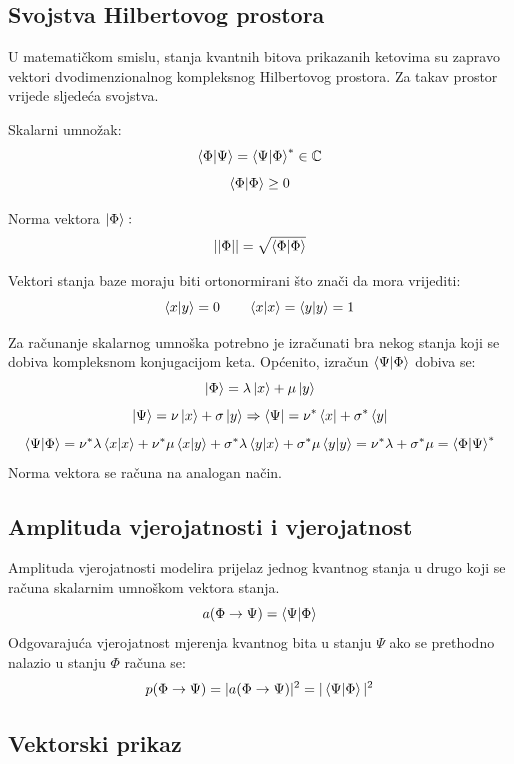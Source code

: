 \subsection{Svojstva Hilbertovog prostora}
U matematičkom smislu, stanja kvantnih bitova prikazanih ketovima su zapravo vektori dvodimenzionalnog kompleksnog Hilbertovog prostora. Za takav prostor vrijede sljedeća svojstva.

Skalarni umnožak:
\[
\braket{\Phi|\Psi} = \braket{\Psi|\Phi}^* \in \mathbb{C}
\]
\[
\braket{\Phi|\Phi} \geq 0
\]

Norma vektora $\ket{\Phi}:$
\[
||\Phi|| = \sqrt{\braket{\Phi|\Phi}}
\]

Vektori stanja baze moraju biti ortonormirani što znači da mora vrijediti:
\[
\braket{x|y} = 0
\qquad
\braket{x|x} = \braket{y|y} = 1
\]

Za računanje skalarnog umnoška potrebno je izračunati bra nekog stanja koji se dobiva kompleksnom konjugacijom keta. Općenito, izračun $\braket{\Psi|\Phi}$ dobiva se:
\[\ket{\Phi} = \lambda\ket{x} + \mu\ket{y}\]
\[\ket{\Psi} = \nu\ket{x} + \sigma\ket{y} \Rightarrow \bra{\Psi} = \nu^*\bra{x} + \sigma^*\bra{y}\]
\[
\braket{\Psi|\Phi} = \nu^*\lambda\braket{x|x} + \nu^*\mu\braket{x|y} + \sigma^*\lambda\braket{y|x} + \sigma^*\mu\braket{y|y} = \nu^*\lambda + \sigma^*\mu = \braket{\Phi|\Psi}^*
\]
Norma vektora se računa na analogan način.

\subsection{Amplituda vjerojatnosti i vjerojatnost}

Amplituda vjerojatnosti modelira prijelaz jednog kvantnog stanja u drugo koji se računa skalarnim umnoškom vektora stanja.
\[
a(\Phi \rightarrow \Psi) = \braket{\Psi|\Phi}
\]
Odgovarajuća vjerojatnost mjerenja kvantnog bita u stanju $\Psi$ ako se prethodno nalazio u stanju $\Phi$ računa se:
\[
p(\Phi \rightarrow \Psi) = |a(\Phi \rightarrow \Psi)|^2 = |\braket{\Psi|\Phi}|^2
\]

\subsection{Vektorski prikaz}

